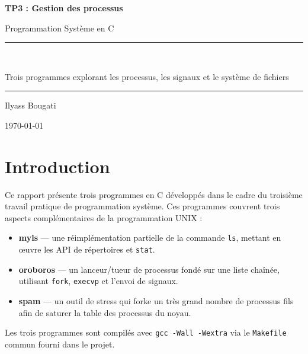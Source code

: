 \documentclass[12pt,a4paper]{article}
\begin{document}
\begin{titlepage}
    \centering
    \vspace*{2cm}
    {\Huge\bfseries TP3 : Gestion des processus\par}
    \vspace{0.5cm}
    {\Large Programmation Système en C\par}
    \vspace{2cm}
    \rule{\linewidth}{0.4pt}\\[0.4cm]
    {\large Trois programmes explorant les processus, les signaux et le système de fichiers\par}
    \rule{\linewidth}{0.4pt}
    \vfill
    {\large Ilyass Bougati\par}
    \vspace{0.3cm}
    {\large \today\par}
\end{titlepage}

\tableofcontents
\newpage

\section{Introduction}

Ce rapport présente trois programmes en C développés dans le cadre du
troisième travail pratique de programmation système. Ces programmes couvrent
trois aspects complémentaires de la programmation UNIX :

\begin{itemize}
    \item \textbf{myls} --- une réimplémentation partielle de la commande
          \texttt{ls}, mettant en \oe{}uvre les API de répertoires et
          \texttt{stat}.
    \item \textbf{oroboros} --- un lanceur/tueur de processus fondé sur une
          liste chaînée, utilisant \texttt{fork}, \texttt{execvp} et
          l'envoi de signaux.
    \item \textbf{spam} --- un outil de stress qui forke un très grand nombre
          de processus fils afin de saturer la table des processus du noyau.
\end{itemize}

Les trois programmes sont compilés avec \texttt{gcc -Wall -Wextra} via le
\texttt{Makefile} commun fourni dans le projet.

\end{document}
